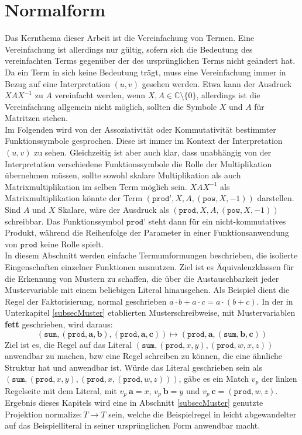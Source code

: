 



\section {Normalform} \label{secErsteNormalform}

Das Kernthema dieser Arbeit ist die Vereinfachung von Termen. Eine Vereinfachung ist allerdings nur gültig, sofern sich die Bedeutung des vereinfachten Terms gegenüber der des ursprünglichen Terms nicht geändert hat. Da ein Term in sich keine Bedeutung trägt, muss eine Vereinfachung immer in Bezug auf eine Interpretation $(u, v)$ gesehen werden. Etwa kann der Ausdruck $X A X^{-1}$ zu $A$ vereinfacht werden, wenn $X, A \in \mathbb{C} \setminus \{0\}$, allerdings ist die Vereinfachung allgemein nicht möglich, sollten die Symbole $X$ und $A$ für Matritzen stehen. \\
Im Folgenden wird von der Assoziativität oder Kommutativität bestimmter Funktionssymbole gesprochen. Diese ist immer im Kontext der Interpretation $(u, v)$ zu sehen. Gleichzeitig ist aber auch klar, dass unabhängig von der Interpretation verschiedene Funktionssymbole die Rolle der Multiplikation übernehmen müssen, sollte sowohl skalare Multiplikation als auch Matrixmultiplikation im selben Term möglich sein. $X A X^{-1}$ als Matrixmultiplikation könnte der Term $(\texttt{prod'}, X, A, (\texttt{pow}, X, -1))$ darstellen. Sind $A$ und $X$ Skalare, wäre der Ausdruck als $(\texttt{prod}, X, A, (\texttt{pow}, X, -1))$ schreibbar. Das Funktionssymbol $\texttt{prod'}$ steht dann für ein nicht-kommutatives Produkt, während die Reihenfolge der Parameter in einer Funktionsanwendung von $\texttt{prod}$ keine Rolle spielt.\\

In diesem Abschnitt werden einfache Termumformungen beschrieben, die isolierte Eingenschaften einzelner Funktionen ausnutzen. Ziel ist es Äquivalenzklassen für die Erkennung von Mustern zu schaffen, die über die Austauschbarkeit jeder Mustervariable mit einem beliebigen Literal hinausgehen. Als Beispiel dient die Regel der Faktorisierung, normal geschrieben $a \cdot b + a \cdot c = a \cdot (b + c)$. In der in Unterkapitel \ref{subsecMuster} etablierten Musterschreibweise, mit Mustervariablen \textbf{fett} geschrieben, wird daraus:
$$(\texttt{sum}, (\texttt{prod}, \mathbf a, \mathbf b), (\texttt{prod}, \mathbf a, \mathbf c)) \mapsto (\texttt{prod}, \mathbf a, (\texttt{sum}, \mathbf b, \mathbf c))$$
Ziel ist es, die Regel auf das Literal $(\texttt{sum}, (\texttt{prod}, x, y), (\texttt{prod}, w, x, z))$ anwendbar zu machen, bzw eine Regel schreiben zu können, die eine ähnliche Struktur hat und anwendbar ist. 
Würde das Literal geschrieben sein als $(\texttt{sum}, (\texttt{prod}, x, y), (\texttt{prod}, x, (\texttt{prod}, w, z)))$, gäbe es ein Match $v_p$ der linken Regelseite mit dem Literal, mit $v_p~\mathbf a = x$, $v_p~\mathbf b = y$ und $v_p~\mathbf c = (\texttt{prod}, w, z)$. Ergebnis dieses Kapitels wird eine in Abschnitt \ref{subsecMuster} genutzte Projektion ${\mathrm{normalize} \colon T \rightarrow T}$ sein, welche die Beispielregel in leicht abgewandelter auf das Beispielliteral in seiner ursprünglichen Form anwendbar macht.\\

